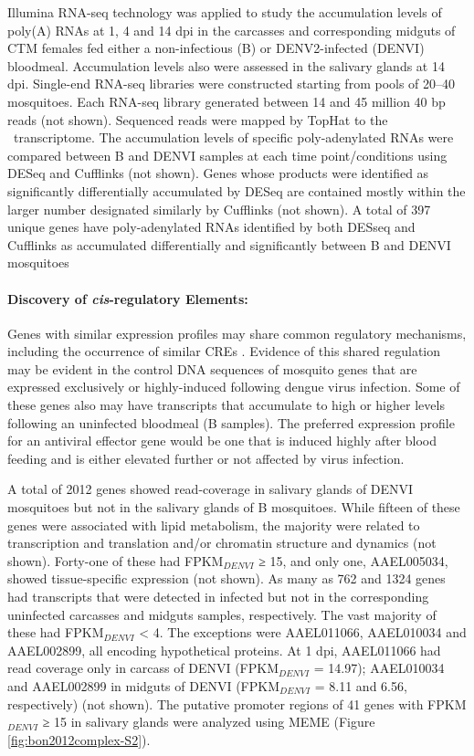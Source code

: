 Illumina RNA-seq technology was applied to study the accumulation levels of poly(A) RNAs at 1, 4 and 14 \gls{dpi} in the carcasses and corresponding midguts of \gls{CTM} females fed either a non-infectious (B) or \gls{DENV}2-infected (\gls{DENVI}) bloodmeal.
Accumulation levels also were assessed in the salivary glands at 14 \gls{dpi}.
Single-end RNA-seq libraries were constructed starting from pools of 20–40 mosquitoes.
Each RNA-seq library generated between 14 and 45 million 40 bp reads (not shown).
Sequenced reads were mapped by TopHat \cite{Trapnell2009} to the \Aa\ transcriptome.
The accumulation levels of specific poly-adenylated RNAs were compared between B and \gls{DENVI} samples at each time point/conditions using DESeq \cite{Anders2010} and Cufflinks \cite{Trapnell2010} (not shown).
Genes whose products were identified as significantly differentially accumulated by DESeq are contained mostly within the larger number designated similarly by Cufflinks (not shown). A total of 397 unique genes have poly-adenylated RNAs identified by both DESseq and Cufflinks as accumulated differentially and significantly between B and \gls{DENVI} mosquitoes

\paragraph*{Discovery of \textit{cis}-regulatory Elements:}

Genes with similar expression profiles may share common regulatory mechanisms, including the occurrence of similar \glspl{CRE} \cite{Sieglaff2009}.
Evidence of this shared regulation may be evident in the control DNA sequences of mosquito genes that are expressed exclusively or highly-induced following dengue virus infection.
Some of these genes also may have transcripts that accumulate to high or higher levels following an uninfected bloodmeal (B samples).
The preferred expression profile for an antiviral effector gene would be one that is induced highly after blood feeding and is either elevated further or not affected by virus infection.

A total of 2012 genes showed read-coverage in salivary glands of \gls{DENVI} mosquitoes but not in the salivary glands of B mosquitoes.
While fifteen of these genes were associated with lipid metabolism, the majority were related to transcription and translation and/or chromatin structure and dynamics (not shown).
Forty-one of these had FPKM$_{DENVI}$ ≥ 15, and only one, AAEL005034, showed tissue-specific expression (not shown).
As many as 762 and 1324 genes had transcripts that were detected in infected but not in the corresponding uninfected carcasses and midguts samples, respectively.
The vast majority of these had FPKM$_{DENVI}$ < 4.
The exceptions were AAEL011066, AAEL010034 and AAEL002899, all encoding hypothetical proteins.
At 1 \gls{dpi}, AAEL011066 had read coverage only in carcass of \gls{DENVI} (FPKM$_{DENVI}$ = 14.97); AAEL010034 and AAEL002899 in midguts of \gls{DENVI} (FPKM$_{DENVI}$ = 8.11 and 6.56, respectively) (not shown).
The putative promoter regions of 41 genes with FPKM$_{DENVI}$ ≥ 15 in salivary glands were analyzed using MEME \cite{Bailey2006} (Figure \ref{fig:bon2012complex-S2}).


